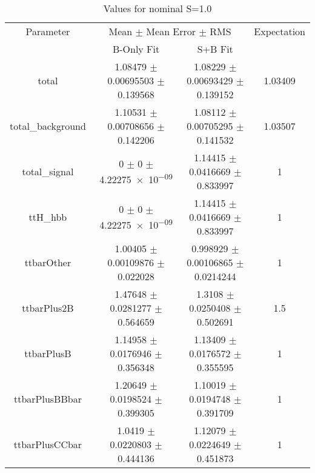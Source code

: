 \begin{table}
\centering
\caption{Values for nominal S=1.0}
\begin{tabular}{cccc}
\toprule
Parameter & \multicolumn{2}{c}{Mean $\pm$ Mean Error $\pm$ RMS} & Expectation\\
 & B-Only Fit & S+B Fit & \\
\midrule
total & \num{1.08479} $\pm$ \num{0.00695503} $\pm$ \num{0.139568} & \num{1.08229} $\pm$ \num{0.00693429} $\pm$ \num{0.139152} & \num{1.03409}\\
total\_background & \num{1.10531} $\pm$ \num{0.00708656} $\pm$ \num{0.142206} & \num{1.08112} $\pm$ \num{0.00705295} $\pm$ \num{0.141532} & \num{1.03507}\\
total\_signal & \num{0} $\pm$ \num{0} $\pm$ \num{4.22275e-09} & \num{1.14415} $\pm$ \num{0.0416669} $\pm$ \num{0.833997} & \num{1}\\
ttH\_hbb & \num{0} $\pm$ \num{0} $\pm$ \num{4.22275e-09} & \num{1.14415} $\pm$ \num{0.0416669} $\pm$ \num{0.833997} & \num{1}\\
ttbarOther & \num{1.00405} $\pm$ \num{0.00109876} $\pm$ \num{0.022028} & \num{0.998929} $\pm$ \num{0.00106865} $\pm$ \num{0.0214244} & \num{1}\\
ttbarPlus2B & \num{1.47648} $\pm$ \num{0.0281277} $\pm$ \num{0.564659} & \num{1.3108} $\pm$ \num{0.0250408} $\pm$ \num{0.502691} & \num{1.5}\\
ttbarPlusB & \num{1.14958} $\pm$ \num{0.0176946} $\pm$ \num{0.356348} & \num{1.13409} $\pm$ \num{0.0176572} $\pm$ \num{0.355595} & \num{1}\\
ttbarPlusBBbar & \num{1.20649} $\pm$ \num{0.0198524} $\pm$ \num{0.399305} & \num{1.10019} $\pm$ \num{0.0194748} $\pm$ \num{0.391709} & \num{1}\\
ttbarPlusCCbar & \num{1.0419} $\pm$ \num{0.0220803} $\pm$ \num{0.444136} & \num{1.12079} $\pm$ \num{0.0224649} $\pm$ \num{0.451873} & \num{1}\\
\bottomrule
\end{tabular}
\end{table}